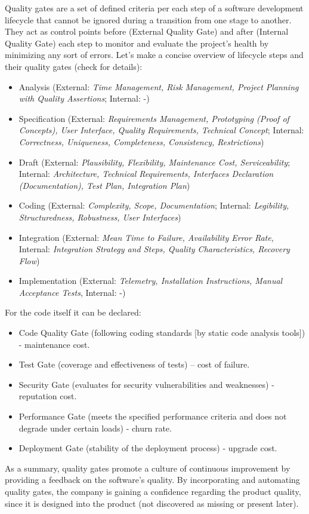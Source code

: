 Quality gates are a set of defined criteria per each step of a software development lifecycle that cannot be
ignored during a transition from one stage to another. They act as control points before (External Quality Gate) and 
after (Internal Quality Gate) each step to monitor and evaluate the project's health by minimizing any sort of errors.
Let's make a concise overview of lifecycle steps and their quality gates (check \cite{Hawl02} for details):

\begin{itemize}
  \item Analysis (External: \emph{Time Management, Risk Management, Project Planning with Quality Assertions}; 
  Internal: -)

  \item Specification (External: \emph{Requirements Management, Prototyping (Proof of Concepts), User Interface, 
  Quality Requirements, Technical Concept}; Internal: \emph{Correctness, Uniqueness, Completeness, Consistency, 
  Restrictions})

  \item Draft (External: \emph{Plausibility, Flexibility, Maintenance Cost, Serviceability}; Internal: 
  \emph{Architecture, Technical Requirements, Interfaces Declaration (Documentation), Test Plan, Integration Plan}) 

  \item Coding (External: \emph{Complexity, Scope, Documentation}; Internal: \emph{Legibility, Structuredness, 
  Robustness, User Interfaces})

  \item Integration (External: \emph{Mean Time to Failure, Availability Error Rate}, Internal: \emph{Integration 
  Strategy and Steps, Quality Characteristics, Recovery Flow})

  \item Implementation (External: \emph{Telemetry, Installation Instructions, Manual Acceptance Tests}, Internal: -)
\end{itemize}

\noindent For the code itself it can be declared: 

\begin{itemize}
  \item Code Quality Gate (following coding standards [by static code analysis tools]) - maintenance cost.
  \item Test Gate (coverage and effectiveness of tests) -- cost of failure.
  \item Security Gate (evaluates for security vulnerabilities and weaknesses) - reputation cost.
  \item Performance Gate (meets the specified performance criteria and does not degrade under certain loads) - churn rate.
  \item Deployment Gate (stability of the deployment process) - upgrade cost.
\end{itemize}

\noindent As a summary, quality gates promote a culture of continuous improvement by providing a feedback on the 
software's quality. By incorporating and automating quality gates, the company is gaining a confidence regarding the
product quality, since it is designed into the product (not discovered as missing or present later).
